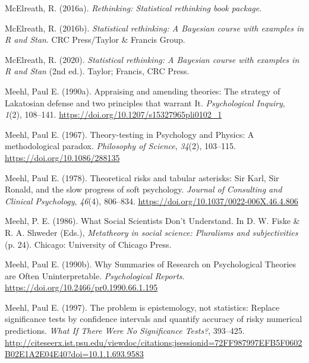 \documentclass[
  a4paper,11pt,twoside,onecolumn,openright,final,oldfontcommands]{memoir}
\newlength{\cslhangindent}
\newlength{\cslentryspacingunit} %
\newenvironment{CSLReferences}[2] %
 {%
  \setlength{\parindent}{0pt}
  \ifodd #1
  \let\oldpar\par
  \def\par{\hangindent=\cslhangindent\oldpar}
  \fi
  \setlength{\parskip}{#2\cslentryspacingunit}
 }%
 {}
\theoremstyle{definition}
\theoremstyle{definition}
\theoremstyle{definition}
\theoremstyle{definition}
\theoremstyle{remark}
\begin{document}
\begin{CSLReferences}{1}{0}
\leavevmode{}%
McElreath, R. (2016a). \emph{Rethinking: Statistical rethinking book package}.

\leavevmode{}%
McElreath, R. (2016b). \emph{Statistical rethinking: A {Bayesian} course with examples in {R} and {Stan}}. CRC Press/Taylor \& Francis Group.

\leavevmode{}%
McElreath, R. (2020). \emph{Statistical rethinking: A {Bayesian} course with examples in {R} and {Stan}} (2nd ed.). Taylor; Francis, CRC Press.

\leavevmode{}%
Meehl, Paul E. (1990a). Appraising and amending theories: {The} strategy of {Lakatosian} defense and two principles that warrant {It}. \emph{Psychological Inquiry}, \emph{1}(2), 108--141. \url{https://doi.org/10.1207/s15327965pli0102_1}

\leavevmode{}%
Meehl, Paul E. (1967). Theory-testing in {Psychology} and {Physics}: {A} methodological paradox. \emph{Philosophy of Science}, \emph{34}(2), 103--115. \url{https://doi.org/10.1086/288135}

\leavevmode{}%
Meehl, Paul E. (1978). Theoretical risks and tabular asterisks: {Sir} {Karl}, {Sir} {Ronald}, and the slow progress of soft psychology. \emph{Journal of Consulting and Clinical Psychology}, \emph{46}(4), 806--834. \url{https://doi.org/10.1037/0022-006X.46.4.806}

\leavevmode{}%
Meehl, P. E. (1986). What {Social} {Scientists} {Don}'t {Understand}. In D. W. Fiske \& R. A. Shweder (Eds.), \emph{Metatheory in social science: {Pluralisms} and subjectivities} (p. 24). Chicago: University of Chicago Press.

\leavevmode{}%
Meehl, Paul E. (1990b). Why {Summaries} of {Research} on {Psychological} {Theories} are {Often} {Uninterpretable}. \emph{Psychological Reports}. \url{https://doi.org/10.2466/pr0.1990.66.1.195}

\leavevmode{}%
Meehl, Paul E. (1997). The problem is epistemology, not statistics: {Replace} significance tests by confidence intervals and quantify accuracy of risky numerical predictions. \emph{What If There Were No Significance Tests?}, 393--425. \url{http://citeseerx.ist.psu.edu/viewdoc/citations;jsessionid=72FF987997EFB5F0602B02E1A2E04E40?doi=10.1.1.693.9583}


\end{CSLReferences}
\end{document}
